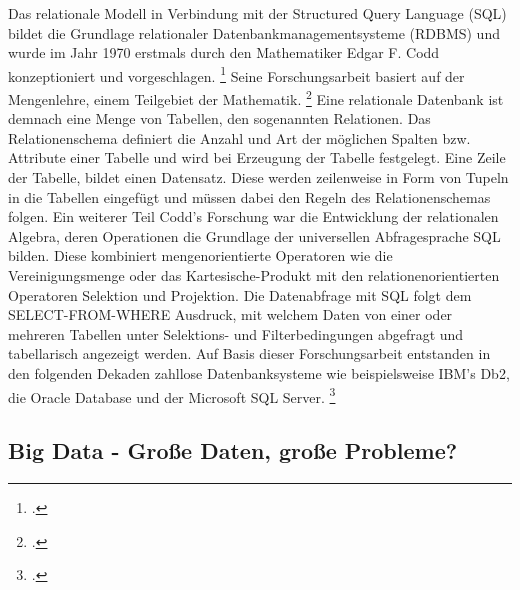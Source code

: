 Das relationale Modell in Verbindung mit der Structured Query Language (SQL)  bildet die Grundlage relationaler Datenbankmanagementsysteme (RDBMS) und wurde im Jahr 1970 erstmals durch den Mathematiker Edgar F. Codd konzeptioniert und vorgeschlagen. \footcite{coddRelationalModelData1970} Seine Forschungsarbeit basiert auf der Mengenlehre, einem Teilgebiet der Mathematik. \footcite[S. 66]{langerDevelopingPathData2023} Eine relationale Datenbank ist demnach eine Menge von Tabellen, den sogenannten Relationen. Das Relationenschema definiert die Anzahl und Art der möglichen Spalten bzw. Attribute einer Tabelle und wird bei Erzeugung der Tabelle festgelegt. Eine Zeile der Tabelle, bildet einen Datensatz. Diese werden zeilenweise in Form von Tupeln in die Tabellen eingefügt und müssen dabei den Regeln des Relationenschemas folgen. Ein weiterer Teil Codd's Forschung war die Entwicklung der relationalen Algebra, deren Operationen die Grundlage der universellen Abfragesprache SQL bilden. Diese kombiniert mengenorientierte Operatoren wie die Vereinigungsmenge oder das Kartesische-Produkt mit den relationenorientierten Operatoren Selektion und Projektion. Die Datenabfrage mit SQL folgt dem SELECT-FROM-WHERE Ausdruck, mit welchem Daten von einer oder mehreren Tabellen unter Selektions- und Filterbedingungen abgefragt und tabellarisch angezeigt werden. Auf Basis dieser Forschungsarbeit entstanden in den folgenden Dekaden zahllose Datenbanksysteme wie beispielsweise IBM's Db2, die Oracle Database und der Microsoft SQL Server. \footcite[S. 15-24]{meierWerkzeugeDigitalenWirtschaft2018}


\subsection{Big Data - Große Daten, große Probleme?}

